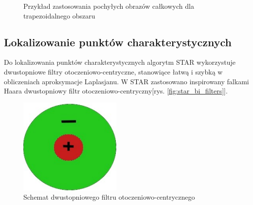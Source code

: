 \begin{figure}
\centering
{}
\caption{Przykład zastosowania pochyłych obrazów całkowych dla trapezoidalnego obszaru}
\label{fig:cs_trapezoidal}
\end{figure}







\subsection{Lokalizowanie punktów charakterystycznych}


Do lokalizowania punktów charakterystycznych algorytm STAR wykorzystuje dwustopniowe filtry otoczeniowo-centryczne, stanowiące łatwą i szybką w obliczeniach aproksymacje Laplasjanu. W STAR zastosowano inspirowany falkami Haara dwustopniowy filtr otoczeniowo-centryczny[rys. \ref{fig:star_bi_filters}].



\begin{figure}[!htb]
\centering
\includegraphics[scale=0.5]{pict/02/star/wg_haar.png}
\caption{Schemat dwustopniowego filtru otoczeniowo-centrycznego}
\label{fig:wg_haar}
\end{figure}

